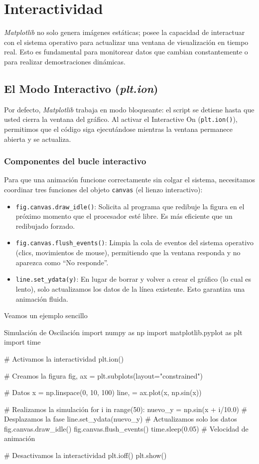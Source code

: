 \section{Interactividad}

\textit{Matplotlib} no solo genera imágenes estáticas; posee la capacidad de interactuar con el sistema operativo para actualizar una ventana de visualización en tiempo real. Esto es fundamental para monitorear datos que cambian constantemente o para realizar demostraciones dinámicas.

\subsection{El Modo Interactivo (\textit{plt.ion})}

Por defecto, \textit{Matplotlib} trabaja en modo bloqueante: el script se detiene hasta que usted cierra la ventana del gráfico. Al activar el Interactive On (\texttt{plt.ion()}), permitimos que el código siga ejecutándose mientras la ventana permanece abierta y se actualiza.

\subsubsection{Componentes del bucle interactivo}

Para que una animación funcione correctamente sin colgar el sistema, necesitamos coordinar tres funciones del objeto \texttt{canvas} (el lienzo interactivo):

\begin{itemize}
\item \texttt{fig.canvas.draw\_idle()}: Solicita al programa que redibuje la figura en el próximo momento que el procesador esté libre. Es más eficiente que un redibujado forzado.
\item \texttt{fig.canvas.flush\_events()}: Limpia la cola de eventos del sistema operativo (clics, movimientos de mouse), permitiendo que la ventana responda y no aparezca como ``No responde''.
\item \texttt{line.set\_ydata(y)}: En lugar de borrar y volver a crear el gráfico (lo cual es lento), solo actualizamos los datos de la línea existente. Esto garantiza una animación fluida.
\end{itemize}

Veamos un ejemplo sencillo
\begin{pycode}{Simulación de Oscilación}
import numpy as np
import matplotlib.pyplot as plt
import time

# Activamos la interactividad
plt.ion()

# Creamos la figura
fig, ax = plt.subplots(layout="constrained")

# Datos
x = np.linspace(0, 10, 100)
line, = ax.plot(x, np.sin(x))

# Realizamos la simulación
for i in range(50):
    nuevo_y = np.sin(x + i/10.0) # Desplazamos la fase
    line.set_ydata(nuevo_y)      # Actualizamos solo los datos
    fig.canvas.draw_idle()
    fig.canvas.flush_events()
    time.sleep(0.05)             # Velocidad de animación

# Desactivamos la interactividad
plt.ioff()
plt.show()
\end{pycode}

